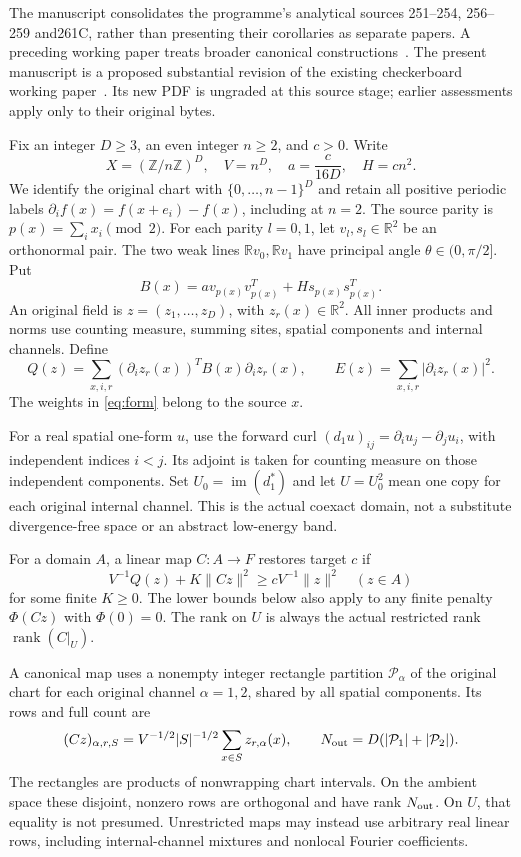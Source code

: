 \documentclass[11pt,a4paper]{article}
\newcommand{\R}{\mathbb R}
\newcommand{\Z}{\mathbb Z}
\newcommand{\im}{\operatorname{im}}
\newcommand{\rank}{\operatorname{rank}}
\newcommand{\norm}[1]{\lVert#1\rVert}
\begin{document}
The manuscript consolidates the programme's analytical sources 251--254, 256--259 and261C,
rather than presenting their corollaries as separate papers. A preceding
working paper treats broader canonical constructions~\cite{eriksson250}.
The present manuscript is a proposed substantial revision of the existing
checkerboard working paper~\cite{eriksson255}. Its new PDF is ungraded at
this source stage; earlier assessments apply only to their original bytes.

Fix an integer $D\geq3$, an even integer $n\geq2$, and $c>0$. Write
\[
 X=(\Z/n\Z)^D,\quad V=n^D,\quad
 a=\frac{c}{16D},\quad H=cn^2.
\]
We identify the original chart with $\{0,\ldots,n-1\}^D$ and retain all
positive periodic labels $\partial_i f(x)=f(x+e_i)-f(x)$, including at $n=2$.
The source parity is $p(x)=\sum_i x_i\pmod2$. For each parity $l=0,1$,
let $v_l,s_l\in\R^2$ be an orthonormal pair. The two weak lines
$\R v_0,\R v_1$ have principal angle $\theta\in(0,\pi/2]$. Put
\[
 B(x)=a v_{p(x)}v_{p(x)}^T+H s_{p(x)}s_{p(x)}^T.
\]
An original field is $z=(z_1,\ldots,z_D)$, with $z_r(x)\in\R^2$.
All inner products and norms use counting measure, summing sites, spatial
components and internal channels. Define
\begin{equation}\label{eq:form}
 Q(z)=\sum_{x,i,r}(\partial_i z_r(x))^T B(x)\partial_i z_r(x),
 \qquad E(z)=\sum_{x,i,r}|\partial_i z_r(x)|^2.
\end{equation}
The weights in \eqref{eq:form} belong to the source $x$.

For a real spatial one-form $u$, use the forward curl
$(d_1u)_{ij}=\partial_i u_j-\partial_j u_i$, with independent indices $i<j$.
Its adjoint is taken for counting measure on those independent components.
Set $U_0=\im(d_1^*)$ and let $U=U_0^2$ mean one copy for each original
internal channel. This is the actual coexact domain, not a substitute
divergence-free space or an abstract low-energy band.

For a domain $A$, a linear map $C:A\to F$ restores target $c$ if
\begin{equation}\label{eq:restore}
 V^{-1}Q(z)+K\norm{Cz}^2\geq cV^{-1}\norm{z}^2\quad(z\in A)
\end{equation}
for some finite $K\geq0$. The lower bounds below also apply to any finite
penalty $\Phi(Cz)$ with $\Phi(0)=0$. The rank on $U$ is always the actual
restricted rank $\rank(C|_U)$.

A canonical map uses a nonempty integer rectangle partition $\mathcal P_\alpha$
of the original chart for each original channel $\alpha=1,2$, shared by all
spatial components. Its rows and full count are
\begin{equation}\label{eq:canonical}
 (Cz)_{\alpha,r,S}=V^{-1/2}|S|^{-1/2}\sum_{x\in S}z_{r,\alpha}(x),
 \qquad N_{\rm out}=D(|\mathcal P_1|+|\mathcal P_2|).
\end{equation}
The rectangles are products of nonwrapping chart intervals. On the ambient
space these disjoint, nonzero rows are orthogonal and have rank $N_{\rm out}$.
On $U$, that equality is not presumed. Unrestricted maps may instead use
arbitrary real linear rows, including internal-channel mixtures and nonlocal
Fourier coefficients.
\end{document}

